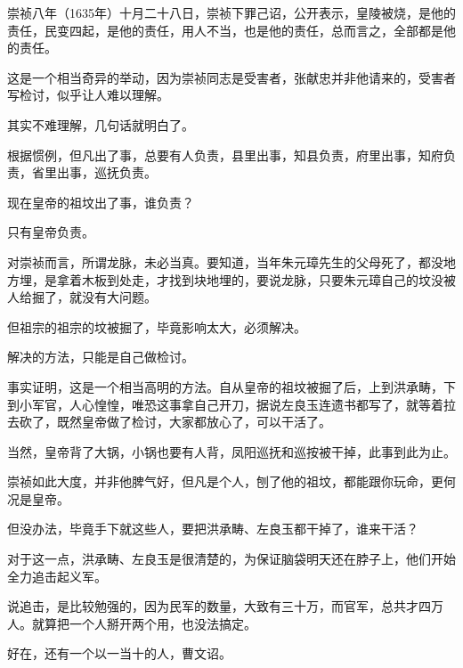 \begin{multicols}{\theparacolNo}
崇祯八年（1635年）十月二十八日，崇祯下罪己诏，公开表示，皇陵被烧，是他的责任，民变四起，是他的责任，用人不当，也是他的责任，总而言之，全部都是他的责任。

这是一个相当奇异的举动，因为崇祯同志是受害者，张献忠并非他请来的，受害者写检讨，似乎让人难以理解。

其实不难理解，几句话就明白了。

根据惯例，但凡出了事，总要有人负责，县里出事，知县负责，府里出事，知府负责，省里出事，巡抚负责。

现在皇帝的祖坟出了事，谁负责？

只有皇帝负责。

对崇祯而言，所谓龙脉，未必当真。要知道，当年朱元璋先生的父母死了，都没地方埋，是拿着木板到处走，才找到块地埋的，要说龙脉，只要朱元璋自己的坟没被人给掘了，就没有大问题。

但祖宗的祖宗的坟被掘了，毕竟影响太大，必须解决。

解决的方法，只能是自己做检讨。

事实证明，这是一个相当高明的方法。自从皇帝的祖坟被掘了后，上到洪承畴，下到小军官，人心惶惶，唯恐这事拿自己开刀，据说左良玉连遗书都写了，就等着拉去砍了，既然皇帝做了检讨，大家都放心了，可以干活了。

当然，皇帝背了大锅，小锅也要有人背，凤阳巡抚和巡按被干掉，此事到此为止。

崇祯如此大度，并非他脾气好，但凡是个人，刨了他的祖坟，都能跟你玩命，更何况是皇帝。

但没办法，毕竟手下就这些人，要把洪承畴、左良玉都干掉了，谁来干活？

对于这一点，洪承畴、左良玉是很清楚的，为保证脑袋明天还在脖子上，他们开始全力追击起义军。

说追击，是比较勉强的，因为民军的数量，大致有三十万，而官军，总共才四万人。就算把一个人掰开两个用，也没法搞定。

好在，还有一个以一当十的人，曹文诏。
\ifnum{}
	\end{multicols}
\fi
\newpage

